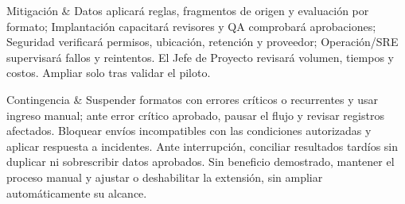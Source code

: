 \documentclass[11pt,letterpaper]{report}
\newcommand{\CampoFicha}[2]{#1 & #2 \\ \hline}
\begin{document}
{\CampoFicha{Mitigación}{%
Datos aplicará reglas, fragmentos de origen y evaluación por formato; Implantación capacitará revisores y QA comprobará aprobaciones; Seguridad verificará permisos, ubicación, retención y proveedor; Operación/SRE supervisará fallos y reintentos. El Jefe de Proyecto revisará volumen, tiempos y costos. Ampliar solo tras validar el piloto.
}

\CampoFicha{Contingencia}{%
Suspender formatos con errores críticos o recurrentes y usar ingreso manual; ante error crítico aprobado, pausar el flujo y revisar registros afectados. Bloquear envíos incompatibles con las condiciones autorizadas y aplicar respuesta a incidentes. Ante interrupción, conciliar resultados tardíos sin duplicar ni sobrescribir datos aprobados. Sin beneficio demostrado, mantener el proceso manual y ajustar o deshabilitar la extensión, sin ampliar automáticamente su alcance.
}
}
\end{document}
